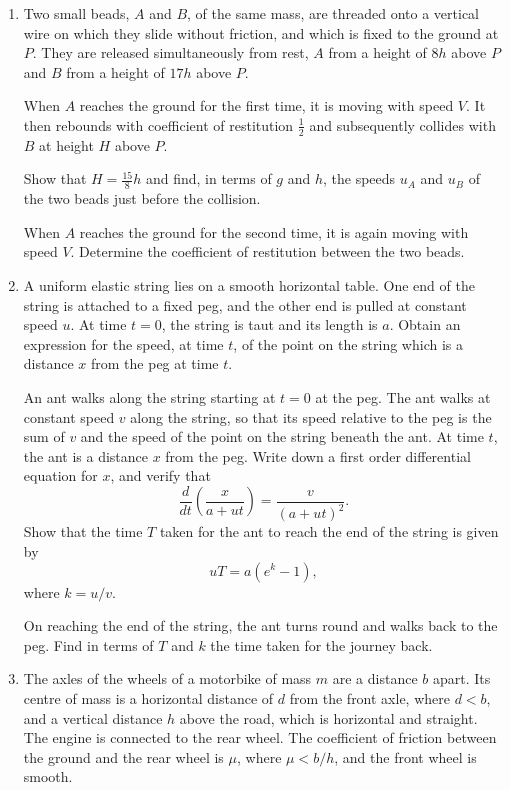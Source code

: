 \documentclass[12pt]{article}
\begin{document}
\begin{enumerate}
\section*{Section B: Mechanics}

\item Two small beads, $A$ and $B$, of the same mass, are threaded onto a vertical wire on which they slide without friction, and which is fixed to the ground at $P$. They are released simultaneously from rest, $A$ from a height of $8h$ above $P$ and $B$ from a height of $17h$ above $P$.

When $A$ reaches the ground for the first time, it is moving with speed $V$. It then rebounds with coefficient of restitution $\frac{1}{2}$ and subsequently collides with $B$ at height $H$ above $P$.

Show that $H=\frac{15}{8}h$ and find, in terms of $g$ and $h$, the speeds $u_A$ and $u_B$ of the two beads just before the collision.

When $A$ reaches the ground for the second time, it is again moving with speed $V$. Determine the coefficient of restitution between the two beads.

\item A uniform elastic string lies on a smooth horizontal table. One end of the string is attached to a fixed peg, and the other end is pulled at constant speed $u$. At time $t=0$, the string is taut and its length is $a$. Obtain an expression for the speed, at time $t$, of the point on the string which is a distance $x$ from the peg at time $t$.

An ant walks along the string starting at $t=0$ at the peg. The ant walks at constant speed $v$ along the string, so that its speed relative to the peg is the sum of $v$ and the speed of the point on the string beneath the ant. At time $t$, the ant is a distance $x$ from the peg. Write down a first order differential equation for $x$, and verify that
\[
\frac{d}{dt}\left(\frac{x}{a+ut}\right)=\frac{v}{(a+ut)^2}.
\]
Show that the time $T$ taken for the ant to reach the end of the string is given by
\[
uT=a(e^k-1),
\]
where $k=u/v$.

On reaching the end of the string, the ant turns round and walks back to the peg. Find in terms of $T$ and $k$ the time taken for the journey back.

\item The axles of the wheels of a motorbike of mass $m$ are a distance $b$ apart. Its centre of mass is a horizontal distance of $d$ from the front axle, where $d<b$, and a vertical distance $h$ above the road, which is horizontal and straight. The engine is connected to the rear wheel. The coefficient of friction between the ground and the rear wheel is $\mu$, where $\mu<b/h$, and the front wheel is smooth.


\end{enumerate}
\end{document}
